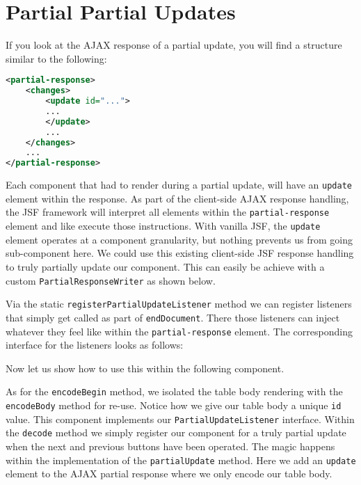 \section{Partial Partial Updates}
If you look at the AJAX response of a partial update, you will find a structure similar to the following:
\begin{lstlisting}[language=XML]
<partial-response>
	<changes>
		<update id="...">
		...
		</update>
		...
	</changes>
	...
</partial-response>
\end{lstlisting}
Each component that had to render during a partial update, will have an \texttt{update} element within the response.
As part of the client-side AJAX response handling, the JSF framework will interpret all elements within the \texttt{partial-response} element and like execute those instructions.
With vanilla JSF, the \texttt{update} element operates at a component granularity, but nothing prevents us from going sub-component here.
We could use this existing client-side JSF response handling to truly partially update our component.
This can easily be achieve with a custom \texttt{PartialResponseWriter} as shown below.

Via the static \texttt{registerPartialUpdateListener} method we can register listeners that simply get called as part of \texttt{endDocument}.
There those listeners can inject whatever they feel like within the \texttt{partial-response} element.
The corresponding interface for the listeners looks as follows:


Now let us show how to use this within the following component.

As for the \texttt{encodeBegin} method, we isolated the table body rendering with the \texttt{encodeBody} method for re-use.
Notice how we give our table body a unique \texttt{id} value.
This component implements our \texttt{PartialUpdateListener} interface.
Within the \texttt{decode} method we simply register our component for a truly partial update when the next and previous buttons have been operated.
The magic happens within the implementation of the \texttt{partialUpdate} method.
Here we add an \texttt{update} element to the AJAX partial response where we only encode our table body.

